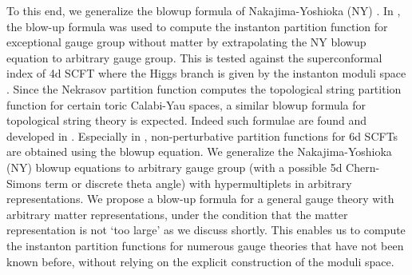 \documentclass[letterpaper, 11pt]{article}
\begin{document}
To this end, we generalize the blowup formula of Nakajima-Yoshioka (NY) \cite{Nakajima:2003pg,Nakajima:2003uh,Nakajima:2005fg, Gottsche:2006bm, Nakajima:2009qjc, Gottsche:2010ig}. In \cite{Keller:2012da}, the blow-up formula was used to compute the instanton partition function for exceptional gauge group without matter by extrapolating the NY blowup equation to arbitrary gauge group. This is tested against the superconformal index of 4d SCFT where the Higgs branch is given by the instanton moduli space \cite{Gaiotto:2012uq}. Since the Nekrasov partition function computes the topological string partition function for certain toric Calabi-Yau spaces, a similar blowup formula for topological string theory is expected. Indeed such formulae are found and developed in \cite{Grassi:2016nnt, Gu:2017ccq, Huang:2017mis, Gu:2018gmy,Gu:2019dan}. Especially in \cite{Gu:2018gmy,Gu:2019dan}, non-perturbative partition functions for 6d SCFTs are obtained using the blowup equation. 
We generalize the Nakajima-Yoshioka (NY) blowup equations \cite{Nakajima:2003pg,Nakajima:2003uh,Nakajima:2005fg, Gottsche:2006bm, Nakajima:2009qjc, Gottsche:2010ig} to arbitrary gauge group (with a possible 5d Chern-Simons term or discrete theta angle) with hypermultiplets in arbitrary representations. We propose a blow-up formula for a general gauge theory with arbitrary matter representations, under the condition that the matter representation is not `too large' as we discuss shortly. This enables us to compute the instanton partition functions for numerous gauge theories that have not been known before, without relying on the explicit construction of the moduli space. 
\end{document}
